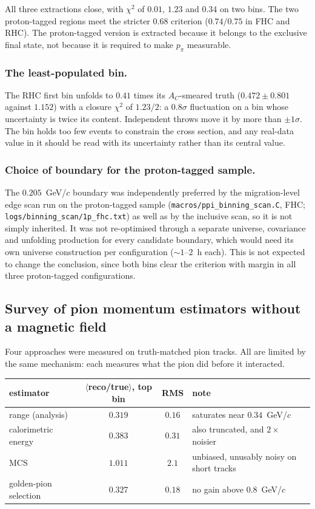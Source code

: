 \documentclass[11pt,a4paper]{article}
\begin{document}
All three extractions close, with $\chi^2$ of $0.01$, $1.23$ and $0.34$ on two bins.
The two proton-tagged regions meet the stricter $0.68$ criterion ($0.74/0.75$ in
FHC and RHC). The proton-tagged version is extracted because it belongs to the exclusive
final state, not because it is required to make $p_\pi$ measurable.

\subsubsection{The least-populated bin.} The RHC first bin unfolds to $0.41$ times its
$A_C$-smeared truth ($0.472\pm0.801$ against $1.152$) with a closure
$\chi^2$ of $1.23/2$: a $0.8\sigma$ fluctuation on a bin whose uncertainty is twice its
content. Independent throws move it by more than $\pm1\sigma$. The bin holds too few
events to constrain the cross section, and any real-data value in it should be read with its
uncertainty rather than its central value.

\subsubsection{Choice of boundary for the proton-tagged sample.} The $0.205$~GeV/$c$
boundary was independently preferred
by the migration-level edge scan run on the proton-tagged sample
(\texttt{macros/ppi\_binning\_scan.C}, FHC; \texttt{logs/binning\_scan/1p\_fhc.txt}) as
well as by the inclusive scan, so it is not simply inherited. It was not
re-optimised through a separate universe, covariance and unfolding production for every
candidate boundary, which would need its own universe construction per configuration
($\sim\!1$--$2$~h each). This is not expected to change the conclusion, since both bins
clear the criterion with margin in all three proton-tagged configurations.



\subsection{Survey of pion momentum estimators without a magnetic field}
\label{sec:ppi_estimators}

Four approaches were measured on truth-matched pion tracks. All are limited by the same
mechanism: each measures what the pion did before it interacted.

\begin{center}\small
\begin{tabular}{lccl}
\toprule
estimator & $\langle$reco/true$\rangle$, top bin & RMS & note \\\midrule
range (analysis)      & $0.319$ & $0.16$ & saturates near $0.34$~GeV/$c$ \\
calorimetric energy   & $0.383$ & $0.31$ & also truncated, and $2\times$ noisier \\
MCS                   & $1.011$ & $2.1$  & unbiased, unusably noisy on short tracks \\
golden-pion selection & $0.327$ & $0.18$ & no gain above $0.8$~GeV/$c$ \\
\bottomrule
\end{tabular}
\end{center}
\end{document}

